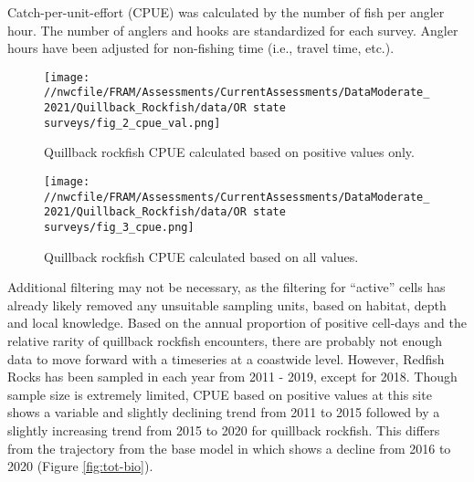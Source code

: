 \documentclass[11pt,
  english,
  a4paper,
]{article}
\begin{document}

Catch-per-unit-effort (CPUE) was calculated by the number of fish per angler hour. The number of anglers and hooks are standardized for each survey. Angler hours have been adjusted for non-fishing time (i.e., travel time, etc.).

\leavevmode\tagmcend\tagstructend\par


\begin{figure}
\centering
\texttt{[image: //nwcfile/FRAM/Assessments/CurrentAssessments/DataModerate\_2021/Quillback\_Rockfish/data/OR state surveys/fig\_2\_cpue\_val.png]}
\caption{Quillback rockfish CPUE calculated based on positive values only.\label{fig:fig-2}}
\end{figure}

\tagmcend\tagstructend


\begin{figure}
\centering
\texttt{[image: //nwcfile/FRAM/Assessments/CurrentAssessments/DataModerate\_2021/Quillback\_Rockfish/data/OR state surveys/fig\_3\_cpue.png]}
\caption{Quillback rockfish CPUE calculated based on all values.\label{fig:fig-3}}
\end{figure}

\tagmcend\tagstructend


Additional filtering may not be necessary, as the filtering for ``active'' cells has already likely removed any unsuitable sampling units, based on habitat, depth and local knowledge. Based on the annual proportion of positive cell-days and the relative rarity of quillback rockfish encounters, there are probably not enough data to move forward with a timeseries at a coastwide level. However, Redfish Rocks has been sampled in each year from 2011 - 2019, except for 2018. Though sample size is extremely limited, CPUE based on positive values at this site shows a variable and slightly declining trend from 2011 to 2015 followed by a slightly increasing trend from 2015 to 2020 for quillback rockfish. This differs from the trajectory from the base model in which shows a decline from 2016 to 2020 (Figure \ref{fig:tot-bio}).
\end{document}
